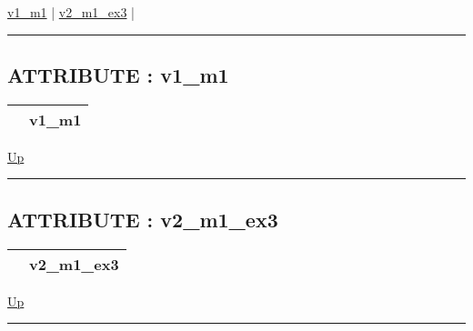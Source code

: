 \hyperlink{ecldoc:intest.in1intest.example_3.mod_1.v1_m1}{v1\_m1}  |
\hyperlink{ecldoc:intest.in1intest.example_3.mod_1.v2_m1_ex3}{v2\_m1\_ex3}  |

\rule{\textwidth}{0.4pt}

\subsection*{ATTRIBUTE : v1\_m1}
\hypertarget{ecldoc:intest.in1intest.example_3.mod_1.v1_m1}{}

{\renewcommand{\arraystretch}{1.5}
\begin{tabularx}{\textwidth}{|>{\raggedright\arraybackslash}l|X|}
\hline
\hspace{0pt} & v1\_m1 \\
\hline
\end{tabularx}
}

\hyperlink{ecldoc:intest.in1intest.Example_3.mod_1}{Up}

\par


\rule{\textwidth}{0.4pt}
\subsection*{ATTRIBUTE : v2\_m1\_ex3}
\hypertarget{ecldoc:intest.in1intest.example_3.mod_1.v2_m1_ex3}{}

{\renewcommand{\arraystretch}{1.5}
\begin{tabularx}{\textwidth}{|>{\raggedright\arraybackslash}l|X|}
\hline
\hspace{0pt} & v2\_m1\_ex3 \\
\hline
\end{tabularx}
}

\hyperlink{ecldoc:intest.in1intest.Example_3.mod_1}{Up}

\par


\rule{\textwidth}{0.4pt}




